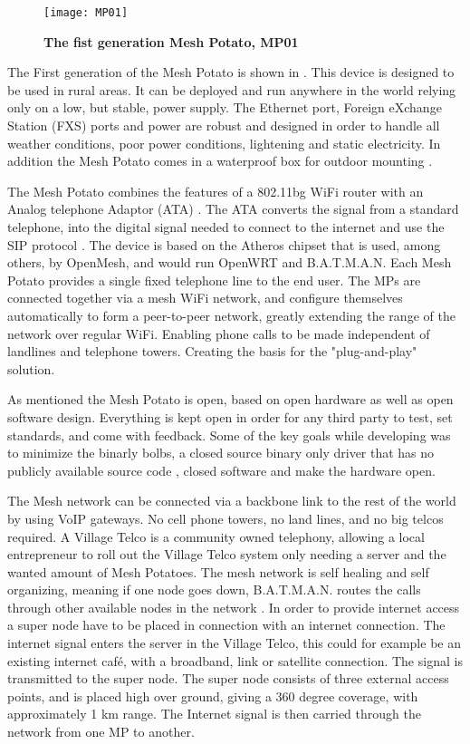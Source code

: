 \begin{figure}[h!]
  \centering
      \texttt{[image: MP01]}
  \caption [The Mesh Potato]{\textbf{The fist generation Mesh Potato, MP01}}
  \label{fig:MP01}
\end{figure}

The First generation of the Mesh Potato is shown in . This device is designed to be used in rural areas. It can be deployed and run anywhere in the world relying only on a low, but stable, power supply. The Ethernet port, Foreign eXchange Station (FXS) ports and power are robust and designed in order to handle all weather conditions, poor power conditions, lightening and static electricity. In addition the Mesh Potato comes in a waterproof box for outdoor mounting \cite{background}.

The Mesh Potato combines the features of a 802.11bg WiFi router with an Analog telephone Adaptor (ATA) \cite{MP}. The ATA converts the signal from a standard telephone, into the digital signal needed to connect to the internet and use the SIP protocol \cite{MParticle}. The device is based on the Atheros chipset that is used, among others, by OpenMesh, and would run OpenWRT and B.A.T.M.A.N. Each Mesh Potato provides a single fixed telephone line to the end user. The MPs are connected together via a mesh WiFi network, and configure themselves automatically to form a peer-to-peer network, greatly extending the range of the network over regular WiFi. Enabling phone calls to be made independent of landlines and telephone towers. Creating the basis for the "plug-and-play" solution. 

As mentioned the Mesh Potato is open, based on open hardware as well as open software design. Everything is kept open in order for any third party to test, set standards, and come with feedback. Some of the key goals while developing was to minimize the binarly bolbs, a closed source binary only driver that has no publicly available source code \cite{binaryBolb}, closed software and make the hardware open. 

The Mesh network can be connected via a backbone link to the rest of the world by using VoIP gateways. No cell phone towers, no land lines, and no big telcos required. A Village Telco is a community owned telephony, allowing a local entrepreneur to roll out the Village Telco system only needing a server and the wanted amount of Mesh Potatoes. The mesh network is self healing and self organizing, meaning if one node goes down, B.A.T.M.A.N. routes the calls through other available nodes in the network \cite{MPbyRowe}. In order to provide internet access a super node have to be placed in connection with an internet connection. The internet signal enters the server in the Village Telco, this could for example be an existing internet café, with a broadband, link or satellite connection. The signal is transmitted to the super node. The super node consists of three external access points, and is placed high over ground, giving a 360 degree coverage, with approximately 1 km range. The Internet signal is then carried through the network from one MP to another. 



